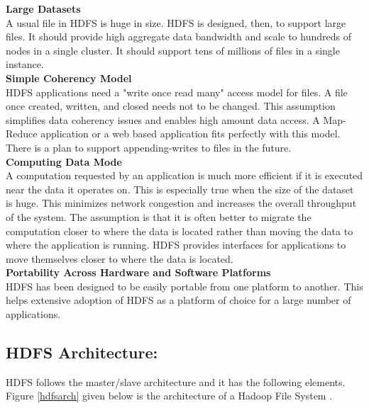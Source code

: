\textbf{\normalsize{Large Datasets}}\\

A usual file in HDFS is huge in size. HDFS is designed, then, to support large files. It should provide high aggregate data bandwidth and scale to hundreds of nodes in a single cluster. It should support tens of millions of files in a single instance.\\

\textbf{\normalsize{Simple Coherency Model}}\\

HDFS applications need a "write once read many" access model for files. A file once created, written, and closed needs not to be changed. This assumption simplifies data coherency issues and enables high amount data access. A Map-Reduce application or a web based application fits perfectly with this model. There is a plan to support appending-writes to files in the future.\\

\textbf{\normalsize{Computing Data Mode}}\\

A computation requested by an application is much more efficient if it is executed near the data it operates on. This is especially true when the size of the dataset is huge. This minimizes network congestion and increases the overall throughput of the system. The assumption is that it is often better to migrate the computation closer to where the data is located rather than moving the data to where the application is running. HDFS provides interfaces for applications to move themselves closer to where the data is located.\\

\textbf{\normalsize{Portability Across Hardware and Software Platforms}}\\

HDFS has been designed to be easily portable from one platform to another. This helps extensive adoption of HDFS as a platform of choice for a large number of applications.

 
\subsection{HDFS Architecture:}

HDFS follows the master/slave architecture and it has the following elements. Figure \ref{hdfsarch} given below is the architecture of a Hadoop File System \cite{cite15}.

